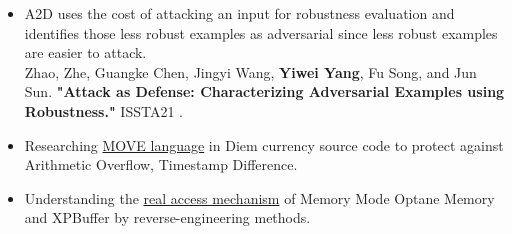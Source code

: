 \documentclass{resume}
\newcommand{\en}[1]{#1}
\newcommand{\zh}[1]{}
\begin{document}
\en{}
\zh{\datedsubsection{\textbf{\href{http://s3l.shanghaitech.edu.cn/}{上海科技大学系统}\href{https://toast-lab.gitee.io/}{实验室}}}{2019/07 -- 2021/06}}
\en{}
\zh{\role{本科生科研}{实习}}
\begin{itemize}
      \item \small{ \en{A2D uses the cost of attacking an input for robustness evaluation and identifies those less robust examples as adversarial since less robust examples are easier to attack.}
      \zh{A2D使用攻击输入的成本来进行鲁棒性评估，并将那些鲁棒性较差的label diff rate这一指标guide生成对抗样本。}}\\
      Zhao, Zhe, Guangke Chen, Jingyi Wang, \textbf{Yiwei Yang}, Fu Song, and Jun Sun. \textbf{"Attack as Defense: Characterizing Adversarial Examples using Robustness."} ISSTA21  .
      \item \en{Researching \href{https://github.com/LEAFERx/movable}{MOVE language} in Diem currency source code to protect against Arithmetic Overflow, Timestamp Difference.}
            \zh{研究Diem源码中的\href{https://github.com/LEAFERx/movable}{MOVE language}，提高抵御时间戳攻击、整数溢出等的安全性。}
      \item \en{Understanding the \href{https://github.com/victoryang00/pmemable}{real access mechanism} of Memory Mode Optane Memory and XPBuffer by reverse-engineering methods.}
            \zh{通过逆向工程的相关手段去理解在memory mode 下傲腾内存以及XPBuffer的\href{https://github.com/victoryang00/pmemable}{内存置换算法逻辑}。}
\end{itemize}



\end{document}
